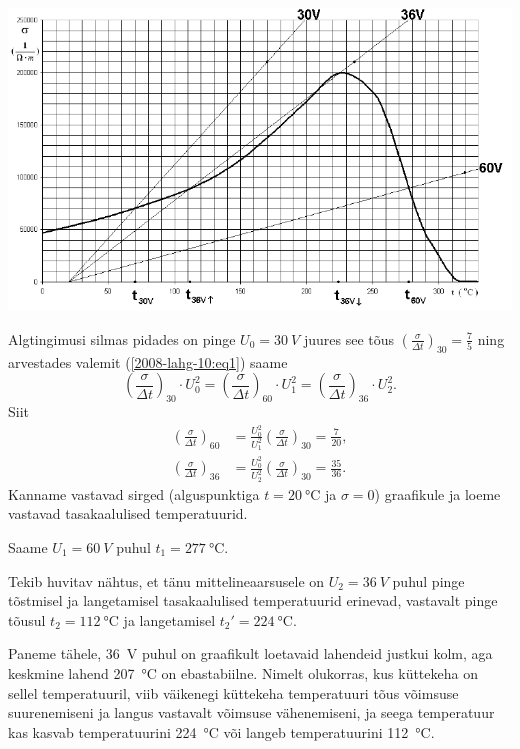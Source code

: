 \documentclass[11pt, twoside]{article}
\begin{document}
{{\begin{center}
	\includegraphics[width=\linewidth]{2008-lahg-10-lah}
\end{center}

Algtingimusi silmas pidades on pinge $U_0 = \SI{30}{V}$ juures see tõus $\left(\frac{\sigma}{\Delta t}\right)_{30}=\frac{7}{5}$ ning arvestades valemit (\ref{2008-lahg-10:eq1}) saame
\[
\left(\frac{\sigma}{\Delta t}\right)_{30} \cdot U_{0}^{2}=\left(\frac{\sigma}{\Delta t}\right)_{60} \cdot U_{1}^{2}=\left(\frac{\sigma}{\Delta t}\right)_{36} \cdot U_{2}^{2}.
\]
Siit 
\[
\begin{aligned}\left(\frac{\sigma}{\Delta t}\right)_{60} &=\frac{U_{0}^{2}}{U_{1}^{2}}\left(\frac{\sigma}{\Delta t}\right)_{30}=\frac{7}{20}, \\\left(\frac{\sigma}{\Delta t}\right)_{36} &=\frac{U_{0}^{2}}{U_{2}^{2}}\left(\frac{\sigma}{\Delta t}\right)_{30}=\frac{35}{36}. \end{aligned}
\]
Kanname vastavad sirged (alguspunktiga $t = \SI{20}{\celsius}$ ja $\sigma = 0$) graafikule ja loeme vastavad tasakaalulised temperatuurid.

Saame $U_1 = \SI{60}{V}$ puhul $t_1 = \SI{277}{\celsius}$.

Tekib huvitav nähtus, et tänu mittelineaarsusele on $U_2 = \SI{36}{V}$ puhul pinge tõstmisel ja langetamisel tasakaalulised temperatuurid erinevad, vastavalt pinge tõusul $t_2 = \SI{112}{\celsius}$ ja langetamisel $t_2' = \SI{224}{\celsius}$.

Paneme tähele, \SI{36}{V} puhul on graafikult loetavaid lahendeid justkui kolm, aga keskmine lahend \SI{207}{\celsius} on ebastabiilne. Nimelt olukorras, kus küttekeha on sellel temperatuuril, viib väikenegi küttekeha temperatuuri tõus võimsuse suurenemiseni ja langus vastavalt võimsuse vähenemiseni, ja seega temperatuur kas kasvab temperatuurini \SI{224}{\celsius} või langeb temperatuurini \SI{112}{\celsius}.
\fi
}

}
\end{document}
